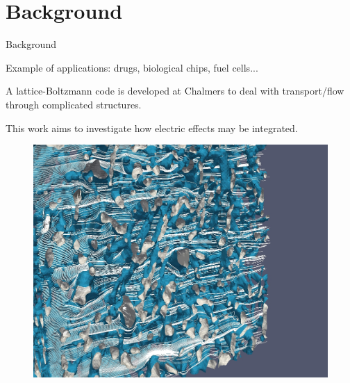 \section{Background}

\begin{frame}{Background}


\begin{itemize*}
\item Example of applications: drugs, biological chips, fuel cells...
\item A lattice-Boltzmann code is developed at Chalmers to deal with
  transport/flow through complicated structures.
\item This work aims to investigate how electric effects may be integrated.
\end{itemize*}


\end{frame}

\begin{frame}[plain]
\begin{figure}
\begin{center}
\includegraphics[width=1.0\textwidth]{fig/diffusion_w4.jpg}
\end{center}
\end{figure}
\end{frame}
